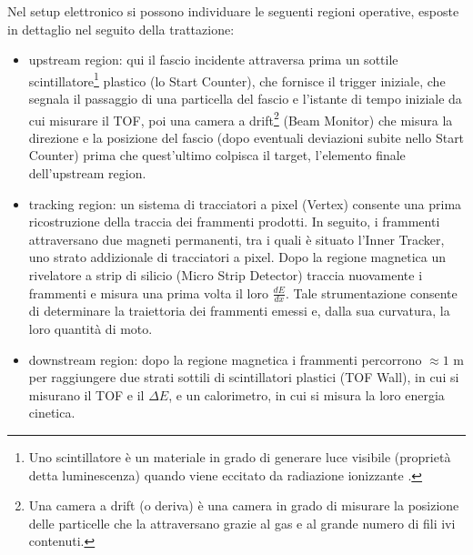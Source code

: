 \documentclass[12pt,a4paper,twoside]{report}
\begin{document}
	Nel setup elettronico si possono individuare le seguenti regioni operative, esposte in dettaglio nel seguito della trattazione:
	\begin{itemize}
		\item upstream region: qui il fascio incidente attraversa prima un sottile scintillatore\footnote{Uno scintillatore è un materiale in grado di generare luce visibile (proprietà detta luminescenza) quando viene eccitato da radiazione ionizzante \cite{RAJA2024101346}.} plastico (lo Start Counter), che fornisce il trigger iniziale, che segnala il passaggio di una particella del fascio e l'istante di tempo iniziale da cui misurare il TOF, poi una camera a drift\footnote{Una camera a drift (o deriva) è una camera in grado di misurare la posizione delle particelle che la attraversano grazie al gas e al grande numero di fili ivi contenuti.} (Beam Monitor) che misura la direzione e la posizione del fascio (dopo eventuali deviazioni subite nello Start Counter) prima che quest'ultimo colpisca il target, l'elemento finale dell'upstream region.
		\item tracking region: un sistema di tracciatori a pixel (Vertex) consente una prima ricostruzione della traccia dei frammenti prodotti. In seguito, i frammenti attraversano due magneti permanenti, tra i quali è situato l'Inner Tracker, uno strato addizionale di tracciatori a pixel. Dopo la regione magnetica un rivelatore a strip di silicio (Micro Strip Detector) traccia nuovamente i frammenti e misura una prima volta il loro $\frac{dE}{dx}$. Tale strumentazione consente di determinare la traiettoria dei frammenti emessi e, dalla sua curvatura, la loro quantità di moto.
		\item downstream region: dopo la regione magnetica i frammenti percorrono $\approx1\mbox{ m}$ per raggiungere due strati sottili di scintillatori plastici (TOF Wall), in cui si misurano il TOF e il $\Delta E$, e un calorimetro, in cui si misura la loro energia cinetica.
	\end{itemize}
	
\end{document}
